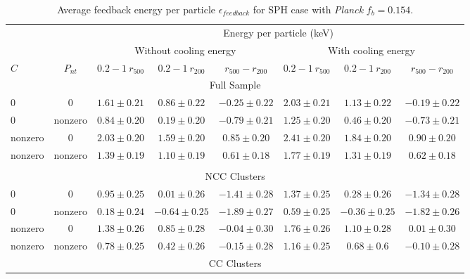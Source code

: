 \documentclass[a4paper,fleqn,usenatbib]{mnras}
\begin{document}
\begin{table*}
 \caption{Average feedback energy per particle $\epsilon_{feedback}$ for SPH case with {\it Planck} $f_{b}=0.154$.}
 \label{sphplanck}
 \begin{tabular}{@{}lccccccc}
  \hline
 &&\multicolumn{6}{c}{Energy per particle (keV) }\\
    \cline{3-8}
&&\multicolumn{3}{c}{Without cooling energy}&\multicolumn{3}{c}{With cooling energy}\\
\cline{3-8}
 $C$    &$P_{nt}$   & $0.2-1~r_{500}$ &   $0.2-1~r_{200}$& $r_{500}-r_{200}$&   $0.2-1~r_{500}$&$0.2-1~r_{200}$&$r_{500}-r_{200}$\\
  \hline
\multicolumn{8}{c}{Full Sample}\\
\hline
 0        &0          &$1.61\pm0.21$     &$0.86\pm0.22$  & $-0.25\pm0.22$  &$2.03\pm0.21$      &$1.13\pm0.22$   & $-0.19\pm0.22$     \\
 0        & nonzero   & $0.84\pm0.20$   &$0.19\pm0.20$  & $-0.79\pm0.21$ & $1.25\pm0.20$     &$0.46\pm0.20$   &  $-0.73\pm0.21$    \\
nonzero   & 0         &$2.03\pm0.20$    &$1.59\pm0.20$  &  $0.85\pm0.20$ &$2.41\pm0.20$      &$1.84\pm0.20$   &  $0.90\pm0.20$   \\
nonzero   & nonzero   &$1.39\pm0.19$     &$1.10\pm0.19$  &  $0.61\pm0.18$ &$1.77\pm0.19$     &$1.31\pm0.19$   &  $0.62\pm0.18$   \\\\
  \hline 
\multicolumn{8}{c}{NCC Clusters}\\
\hline
 0        &0          &$ 0.95\pm0.25$    &$0.01\pm0.26$   & $-1.41\pm0.28$   & $1.37\pm0.25$   &$0.28\pm0.26$    &$-1.34\pm0.28$    \\
 0        & nonzero   &$ 0.18\pm0.24$   &$-0.64\pm0.25$  & $-1.89\pm 0.27$   & $0.59\pm0.25$   &$-0.36\pm0.25$    & $-1.82\pm0.26$      \\
nonzero   & 0         &$1.38\pm0.26$  &$0.85\pm0.28$   & $-0.04\pm0.30$    &$1.76\pm0.26$    &$1.10\pm0.28$    &  $0.01\pm0.30$     \\
nonzero   & nonzero   & $0.78\pm0.25$  &$ 0.42\pm 0.26$   & $-0.15\pm0.28$   &$1.16\pm0.25$   &$0.68\pm0.6$    &  $-0.10\pm0.28$     \\
  \hline                                                                     
\multicolumn{8}{c}{CC Clusters}\\

\end{tabular}
\end{table*}
\end{document}
